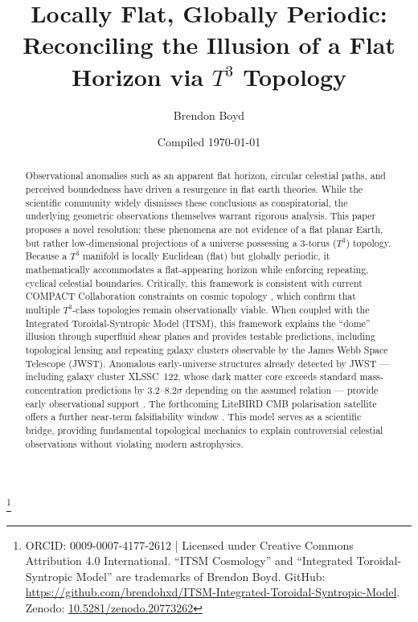 \documentclass[aps,prd,11pt,onecolumn,superscriptaddress,nofootinbib,floatfix]{revtex4-2}
\begin{document}
\title{Locally Flat, Globally Periodic: \\ Reconciling the Illusion of a Flat Horizon via $T^3$ Topology}
\author{Brendon Boyd}
\thanks{ORCID: 0009-0007-4177-2612 | Licensed under Creative Commons Attribution 4.0 International. ``ITSM Cosmology'' and ``Integrated Toroidal-Syntropic Model'' are trademarks of Brendon Boyd. GitHub: \url{https://github.com/brendohxd/ITSM-Integrated-Toroidal-Syntropic-Model}. Zenodo: \href{https://doi.org/10.5281/zenodo.20773262}{10.5281/zenodo.20773262}}
\date{Compiled \today}

\begin{abstract}
Observational anomalies such as an apparent flat horizon, circular celestial paths, and perceived boundedness have driven a resurgence in flat earth theories. While the scientific community widely dismisses these conclusions as conspiratorial, the underlying geometric observations themselves warrant rigorous analysis. This paper proposes a novel resolution: these phenomena are not evidence of a flat planar Earth, but rather low-dimensional projections of a universe possessing a 3-torus ($T^3$) topology. Because a $T^3$ manifold is locally Euclidean (flat) but globally periodic, it mathematically accommodates a flat-appearing horizon while enforcing repeating, cyclical celestial boundaries. Critically, this framework is consistent with current COMPACT Collaboration constraints on cosmic topology \cite{compact_promise, compact_pt1}, which confirm that multiple $T^3$-class topologies remain observationally viable. When coupled with the Integrated Toroidal-Syntropic Model (ITSM), this framework explains the ``dome'' illusion through superfluid shear planes and provides testable predictions, including topological lensing and repeating galaxy clusters observable by the James Webb Space Telescope (JWST). Anomalous early-universe structures already detected by JWST --- including galaxy cluster XLSSC~122, whose dark matter core exceeds standard mass-concentration predictions by 3.2--8.2$\sigma$ depending on the assumed relation --- provide early observational support \cite{finner_2025}. The forthcoming LiteBIRD CMB polarisation satellite offers a further near-term falsifiability window \cite{litebird_2020}. This model serves as a scientific bridge, providing fundamental topological mechanics to explain controversial celestial observations without violating modern astrophysics.
\end{abstract}
\end{document}
